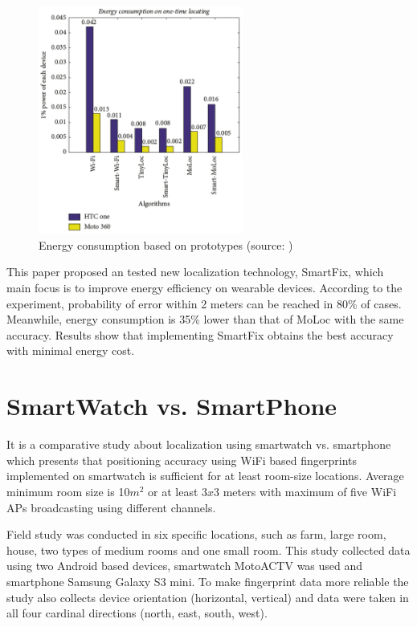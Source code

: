 \begin{figure}[H]
	\begin{centering}
		\includegraphics[width=0.6\textwidth]{img/smart_fix}
		\par\end{centering}
	\caption{Energy consumption based on prototypes (source: \cite{SmartFix})\label{fig:SmartFix}}
	\label{fig01c03}
\end{figure}

This paper proposed an tested new localization technology, SmartFix, which main focus is to improve energy efficiency on wearable devices. According to the experiment, probability of error within 2 meters can be reached in 80\% of cases. Meanwhile, energy consumption is 35\% lower than that of MoLoc with the same accuracy. Results show that implementing SmartFix obtains the best accuracy with minimal energy cost.

\section{SmartWatch vs. SmartPhone}\label{sec:SWvsSP}
It is a comparative study about localization using smartwatch vs. smartphone \cite{SWvsSP} which presents that positioning accuracy using WiFi based fingerprints implemented on smartwatch is sufficient for at least room-size locations. Average minimum room size is 10$m^2$ or at least 3$x$3 meters with maximum of five WiFi APs broadcasting using different channels.

Field study was conducted in six specific locations, such as farm, large room, house, two types of medium rooms and one small room. This study collected data using two Android based devices, smartwatch MotoACTV was used and smartphone Samsung Galaxy S3 mini. To make fingerprint data more reliable the study also collects device orientation (horizontal, vertical) and data were taken in all four cardinal directions (north, east, south, west).


